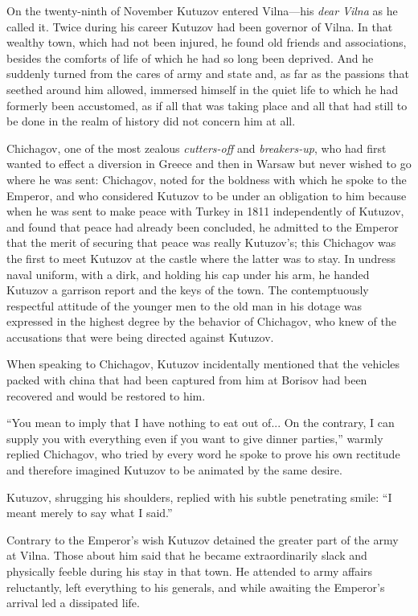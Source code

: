 On the twenty-ninth of November Kutuzov entered Vilna---his
\emph{dear Vilna} as he called it. Twice during his career
Kutuzov had been governor of Vilna. In that wealthy town, which
had not been injured, he found old friends and associations,
besides the comforts of life of which he had so long been
deprived. And he suddenly turned from the cares of army and state
and, as far as the passions that seethed around him allowed,
immersed himself in the quiet life to which he had formerly been
accustomed, as if all that was taking place and all that had
still to be done in the realm of history did not concern him at
all.

Chichagov, one of the most zealous \emph{cutters-off} and
\emph{breakers-up}, who had first wanted to effect a diversion in
Greece and then in Warsaw but never wished to go where he was
sent: Chichagov, noted for the boldness with which he spoke to
the Emperor, and who considered Kutuzov to be under an obligation
to him because when he was sent to make peace with Turkey in 1811
independently of Kutuzov, and found that peace had already been
concluded, he admitted to the Emperor that the merit of securing
that peace was really Kutuzov's; this Chichagov was the first to
meet Kutuzov at the castle where the latter was to stay. In
undress naval uniform, with a dirk, and holding his cap under his
arm, he handed Kutuzov a garrison report and the keys of the
town. The contemptuously respectful attitude of the younger men
to the old man in his dotage was expressed in the highest degree
by the behavior of Chichagov, who knew of the accusations that
were being directed against Kutuzov.

When speaking to Chichagov, Kutuzov incidentally mentioned that
the vehicles packed with china that had been captured from him at
Borisov had been recovered and would be restored to him.

``You mean to imply that I have nothing to eat out of... On the
contrary, I can supply you with everything even if you want to
give dinner parties,'' warmly replied Chichagov, who tried by
every word he spoke to prove his own rectitude and therefore
imagined Kutuzov to be animated by the same desire.

Kutuzov, shrugging his shoulders, replied with his subtle
penetrating smile: ``I meant merely to say what I said.''

Contrary to the Emperor's wish Kutuzov detained the greater part
of the army at Vilna. Those about him said that he became
extraordinarily slack and physically feeble during his stay in
that town. He attended to army affairs reluctantly, left
everything to his generals, and while awaiting the Emperor's
arrival led a dissipated life.

